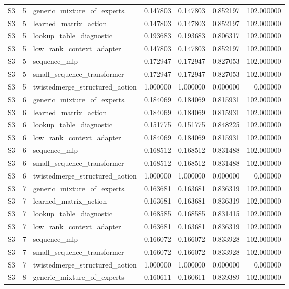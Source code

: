 \begin{tabular}{lrlrrrr}
S3 & 5 & generic_mixture_of_experts & 0.147803 & 0.147803 & 0.852197 & 102.000000 \\
S3 & 5 & learned_matrix_action & 0.147803 & 0.147803 & 0.852197 & 102.000000 \\
S3 & 5 & lookup_table_diagnostic & 0.193683 & 0.193683 & 0.806317 & 102.000000 \\
S3 & 5 & low_rank_context_adapter & 0.147803 & 0.147803 & 0.852197 & 102.000000 \\
S3 & 5 & sequence_mlp & 0.172947 & 0.172947 & 0.827053 & 102.000000 \\
S3 & 5 & small_sequence_transformer & 0.172947 & 0.172947 & 0.827053 & 102.000000 \\
S3 & 5 & twistedmerge_structured_action & 1.000000 & 1.000000 & 0.000000 & 0.000000 \\
S3 & 6 & generic_mixture_of_experts & 0.184069 & 0.184069 & 0.815931 & 102.000000 \\
S3 & 6 & learned_matrix_action & 0.184069 & 0.184069 & 0.815931 & 102.000000 \\
S3 & 6 & lookup_table_diagnostic & 0.151775 & 0.151775 & 0.848225 & 102.000000 \\
S3 & 6 & low_rank_context_adapter & 0.184069 & 0.184069 & 0.815931 & 102.000000 \\
S3 & 6 & sequence_mlp & 0.168512 & 0.168512 & 0.831488 & 102.000000 \\
S3 & 6 & small_sequence_transformer & 0.168512 & 0.168512 & 0.831488 & 102.000000 \\
S3 & 6 & twistedmerge_structured_action & 1.000000 & 1.000000 & 0.000000 & 0.000000 \\
S3 & 7 & generic_mixture_of_experts & 0.163681 & 0.163681 & 0.836319 & 102.000000 \\
S3 & 7 & learned_matrix_action & 0.163681 & 0.163681 & 0.836319 & 102.000000 \\
S3 & 7 & lookup_table_diagnostic & 0.168585 & 0.168585 & 0.831415 & 102.000000 \\
S3 & 7 & low_rank_context_adapter & 0.163681 & 0.163681 & 0.836319 & 102.000000 \\
S3 & 7 & sequence_mlp & 0.166072 & 0.166072 & 0.833928 & 102.000000 \\
S3 & 7 & small_sequence_transformer & 0.166072 & 0.166072 & 0.833928 & 102.000000 \\
S3 & 7 & twistedmerge_structured_action & 1.000000 & 1.000000 & 0.000000 & 0.000000 \\
S3 & 8 & generic_mixture_of_experts & 0.160611 & 0.160611 & 0.839389 & 102.000000 \\

\end{tabular}
